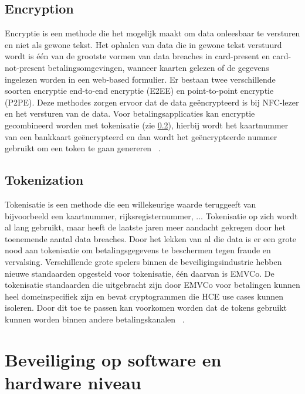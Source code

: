 \subsection{Encryption}
Encryptie is een methode die het mogelijk maakt om data onleesbaar te versturen en niet als gewone tekst. Het ophalen van data die in gewone tekst verstuurd wordt is één van de grootste vormen van data breaches in card-present en card-not-present betalingsomgevingen, wanneer kaarten gelezen of de gegevens ingelezen worden in een web-based formulier. Er bestaan twee verschillende soorten encryptie end-to-end encryptie (E2EE) en point-to-point encryptie (P2PE). Deze methodes zorgen ervoor dat de data geëncrypteerd is bij NFC-lezer en het versturen van de data. Voor betalingsapplicaties kan encryptie gecombineerd worden met tokenisatie (zie \ref{subsec:tok}), hierbij wordt het kaartnummer van een bankkaart geëncrypteerd en dan wordt het geëncrypteerde nummer gebruikt om een token te gaan genereren ~\autocite{SCA2014}.

\subsection{Tokenization}
\label{subsec:tok}
Tokenisatie is een methode die een willekeurige waarde teruggeeft van bijvoorbeeld een kaartnummer, rijksregisternummer, ... Tokenisatie op zich wordt al lang gebruikt, maar heeft de laatste jaren meer aandacht gekregen door het toenemende aantal data breaches. Door het lekken van al die data is er een grote nood aan tokenisatie om betalingsgegevens te beschermen tegen fraude en vervalsing. Verschillende grote spelers binnen de beveiligingsindustrie hebben nieuwe standaarden opgesteld voor tokenisatie, één daarvan is EMVCo. De tokenisatie standaarden die uitgebracht zijn door EMVCo voor betalingen kunnen heel domeinspecifiek zijn en bevat cryptogrammen die HCE use cases kunnen isoleren. Door dit toe te passen kan voorkomen worden dat de tokens gebruikt kunnen worden binnen andere betalingskanalen ~\autocite{SCA2014}.

\section{Beveiliging op software en hardware niveau}

